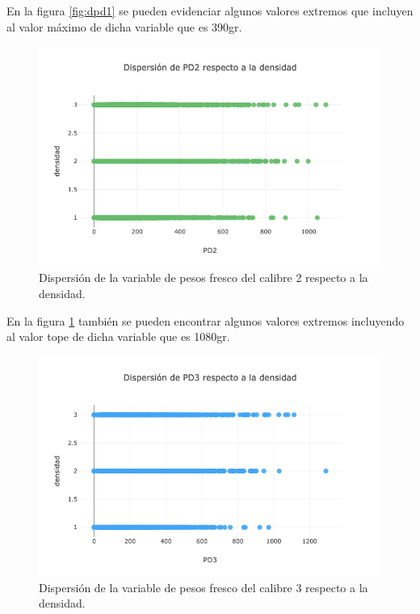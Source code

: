 En la figura \ref{fig:dpd1} se pueden evidenciar algunos valores extremos que incluyen al valor máximo de dicha variable que es 390gr.

\begin{figure}[h!]
	\centering
	\includegraphics[scale=0.5]{d-pd2.png}
	\caption{Dispersión de la variable de pesos fresco del calibre 2 respecto a la densidad.}
	\label{fig:dpd2}
\end{figure}

En la figura \ref{fig:dpd2} también se pueden encontrar algunos valores extremos incluyendo al valor tope de dicha variable que es 1080gr.

\begin{figure}[h!]
	\centering
	\includegraphics[scale=0.5]{d-pd3.png}
	\caption{Dispersión de la variable de pesos fresco del calibre 3 respecto a la densidad.}
	\label{fig:dpd3}
\end{figure}

